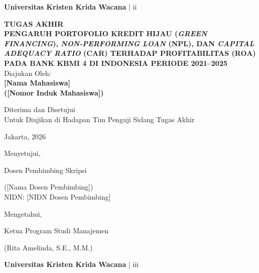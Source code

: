 \documentclass[12pt,a4paper]{article}
\newcommand{\ukrida}{Universitas Kristen Krida Wacana}
\newcommand{\nahamahasiswa}{[Nama Mahasiswa]}
\newcommand{\nim}{[Nomor Induk Mahasiswa]}
\newcommand{\dosbim}{[Nama Dosen Pembimbing]}
\newcommand{\nidn}{[NIDN Dosen Pembimbing]}
\newcommand{\ketprodi}{Rita Amelinda, S.E., M.M.}
\numberwithin{equation}{section}
\begin{document}
\vfill
\begin{flushright}
  \footnotesize\textbf{\ukrida} $|$ ii
\end{flushright}

\newpage
\thispagestyle{frontmatter}
\begin{center}
  {\large\bfseries TUGAS AKHIR}\\[0.6cm]
  {\large\bfseries
    PENGARUH PORTOFOLIO KREDIT HIJAU (\emph{GREEN FINANCING}),
    \emph{NON-PERFORMING LOAN} (NPL), DAN
    \emph{CAPITAL ADEQUACY RATIO} (CAR)
    TERHADAP PROFITABILITAS (ROA) PADA BANK KBMI 4
    DI INDONESIA PERIODE 2021--2025
  }\\[0.6cm]
  {\normalsize Diajukan Oleh:}\\[0.3cm]
  {\large\bfseries \nahamahasiswa}\\[0.2cm]
  {\large\bfseries (\nim)}
\end{center}

\vspace{0.6cm}
\noindent
Diterima dan Disetujui\\
Untuk Diujikan di Hadapan Tim Penguji Sidang Tugas Akhir

\vspace{0.4cm}
\noindent Jakarta, \underline{\hspace{3cm}} 2026

\vspace{0.4cm}
\noindent Menyetujui,

\vspace{0.4cm}
\noindent Dosen Pembimbing Skripsi

\vspace{2.2cm}
\noindent (\dosbim)\\
NIDN: \nidn

\vspace{0.8cm}
\noindent Mengetahui,

\vspace{0.4cm}
\noindent Ketua Program Studi Manajemen

\vspace{2.2cm}
\noindent (\ketprodi)

\vfill
\begin{flushright}
  \footnotesize\textbf{\ukrida} $|$ iii
\end{flushright}
\end{document}
